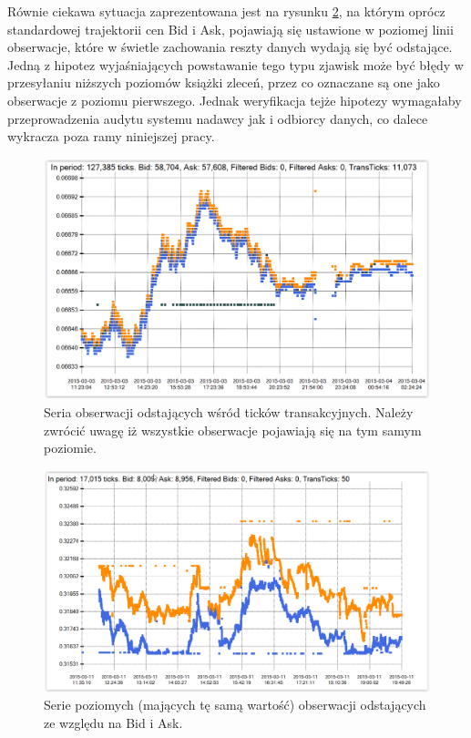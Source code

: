 \documentclass[a4paper,12pt,openany, DIV=calc, headsepline]{scrbook}
\begin{document}
Równie ciekawa sytuacja zaprezentowana jest na rysunku \ref{fig:f6LJ15Row}, na którym oprócz standardowej trajektorii cen Bid i Ask, pojawiają się ustawione w poziomej linii obserwacje, które w świetle zachowania reszty danych wydają się być odstające. Jedną z hipotez wyjaśniających powstawanie tego typu zjawisk może być błędy w przesyłaniu niższych poziomów książki zleceń, przez co oznaczane są one jako obserwacje z poziomu pierwszego. Jednak weryfikacja tejże hipotezy wymagałaby przeprowadzenia audytu systemu nadawcy jak i odbiorcy danych, co dalece wykracza poza ramy niniejszej pracy.

\begin{figure}[H]
  \centering
  \includegraphics[scale=0.5]{wykresy/f6mh15.PNG}
  \caption{Seria obserwacji odstających wśród ticków transakcyjnych. Należy zwrócić uwagę iż wszystkie obserwacje pojawiają się na tym samym poziomie.}
  \label{fig:f6mh15}
\end{figure}

\begin{figure}[H]
  \centering
  \includegraphics[scale=0.5]{wykresy/f6LJ15Row.PNG}
  \caption{Serie poziomych (mających tę samą wartość) obserwacji odstających ze względu na Bid i Ask.}
  \label{fig:f6LJ15Row}
\end{figure}
\end{document}
